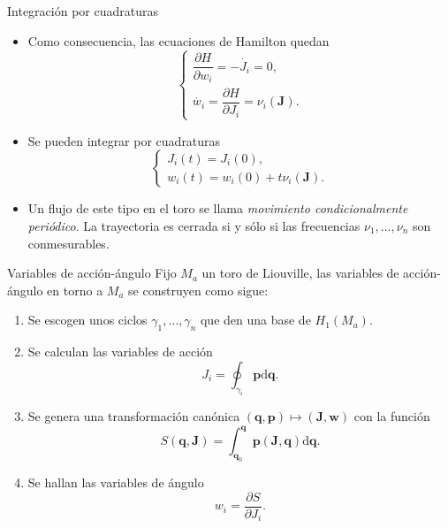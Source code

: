 \documentclass[aspectratio=169,mathserif]{beamer}
\newcommand{\vect}[1]{\mathbf{#1}}
\begin{document}
\begin{frame}{Integración por cuadraturas}
  \begin{itemize}
    \item Como consecuencia, las ecuaciones de Hamilton quedan
      \begin{equation*}
	\begin{cases}
	  \dfrac{\partial H}{\partial w_i}=-\dot{J_i}=0, \\[5 pt]
	  \dot{w_i}= \dfrac{\partial H}{\partial J_i}=\nu_i(\vect{J}).
	\end{cases}
      \end{equation*}
    \pause
    \item Se pueden integrar por cuadraturas
      \begin{equation*}
	\begin{cases}
	  J_i(t)=J_i(0), \\
	  w_i(t)=w_i(0)+t\nu_i(\vect{J}).
	\end{cases}
      \end{equation*}
    \pause
    \item Un flujo de este tipo en el toro se llama \emph{movimiento condicionalmente periódico}. La trayectoria es cerrada si y sólo si las frecuencias $\nu_1,\dots,\nu_n$ son conmesurables.
  \end{itemize}
\end{frame}

  \begin{frame}{Variables de acción-ángulo}
    Fijo $M_a$ un toro de Liouville, las variables de acción-ángulo en torno a $M_a$ se construyen como sigue:
    \pause
    \begin{enumerate}
      \item Se escogen unos ciclos $\gamma_1,\dots,\gamma_n$ que den una base de $H_1(M_a)$.
    \pause
      \item Se calculan las variables de acción
	\begin{equation*}
	  J_i=\oint_{\gamma_i}\vect{p}\mathrm{d}\vect{q}.
	\end{equation*}
    \pause
      \item Se genera una transformación canónica $(\vect{q},\vect{p})\mapsto (\vect{J},\vect{w})$ con la función
	\begin{equation*}
	  S(\vect{q},\vect{J})=\int_{\vect{q}_0}^{\vect{q}}\vect{p}(\vect{J},\vect{q})\mathrm{d}\vect{q}.
	\end{equation*}
    \pause
      \item Se hallan las variables de ángulo
	\begin{equation*}
	  w_i = \frac{\partial S}{\partial J_i}.
	\end{equation*}
    \end{enumerate}
  \end{frame}
\end{document}
